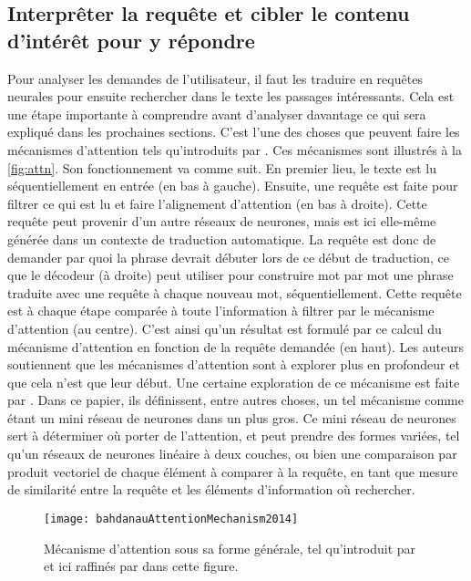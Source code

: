 \subsection{Interprêter la requête et cibler le contenu d'intérêt pour y répondre}
\label{devel:qa}

Pour analyser les demandes de l'utilisateur, il faut les traduire en requêtes neurales pour ensuite rechercher dans le texte les passages intéressants. Cela est une étape importante à comprendre avant d'analyser davantage ce qui sera expliqué dans les prochaines sections. C'est l'une des choses que peuvent faire les mécanismes d'attention tels qu'introduits par \cite{attentionMechanism}. Ces mécanismes sont illustrés à la \autoref{fig:attn}. Son fonctionnement va comme suit. En premier lieu, le texte est lu séquentiellement en entrée (en bas à gauche). Ensuite, une requête est faite pour filtrer ce qui est lu et faire l'alignement d'attention (en bas à droite). Cette requête peut provenir d'un autre réseaux de neurones, mais est ici elle-même générée dans un contexte de traduction automatique. La requête est donc de demander par quoi la phrase devrait débuter lors de ce début de traduction, ce que le décodeur (à droite) peut utiliser pour construire mot par mot une phrase traduite avec une requête à chaque nouveau mot, séquentiellement. Cette requête est à chaque étape comparée à toute l'information à filtrer par le mécanisme d'attention (au centre). C'est ainsi qu'un résultat est formulé par ce calcul du mécanisme d'attention en fonction de la requête demandée (en haut). Les auteurs soutiennent que les mécanismes d'attention sont à explorer plus en profondeur et que cela n'est que leur début. Une certaine exploration de ce mécanisme est faite par \cite{attentionBasedApproaches}. Dans ce papier, ils définissent, entre autres choses, un tel mécanisme comme étant un mini réseau de neurones dans un plus gros. Ce mini réseau de neurones sert à déterminer où porter de l'attention, et peut prendre des formes variées, tel qu'un réseaux de neurones linéaire à deux couches, ou bien une comparaison par produit vectoriel de chaque élément à comparer à la requête, en tant que mesure de similarité entre la requête et les éléments d'information où rechercher. \\

\begin{figure*}
  \centering
  \texttt{[image: bahdanauAttentionMechanism2014]}
  \caption{Mécanisme d'attention sous sa forme générale, tel qu'introduit par \cite{attentionMechanism} et ici raffinés par \cite{attentionBasedApproaches} dans cette figure.}
  \label{fig:attn}
\end{figure*}

